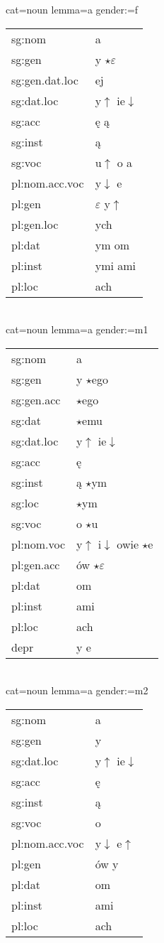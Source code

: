 \documentclass{article}
\begin{document}
\begin{multicols}{2}
cat=noun lemma=a gender:=f\\
\begin{tabular}{l|l}
sg:nom & a\\
sg:gen & y $\star\varepsilon$\\
sg:gen.dat.loc & ej\\
sg:dat.loc & y$\uparrow$ ie$\downarrow$\\
sg:acc & ę ą\\
sg:inst & ą\\
sg:voc & u$\uparrow$ o a\\
pl:nom.acc.voc & y$\downarrow$ e\\
pl:gen & $\varepsilon$ y$\uparrow$\\
pl:gen.loc & ych\\
pl:dat & ym om\\
pl:inst & ymi ami\\
pl:loc & ach\\
\end{tabular}\\

cat=noun lemma=a gender:=m1\\
\begin{tabular}{l|l}
sg:nom & a\\
sg:gen & y $\star$ego\\
sg:gen.acc & $\star$ego\\
sg:dat & $\star$emu\\
sg:dat.loc & y$\uparrow$ ie$\downarrow$\\
sg:acc & ę\\
sg:inst & ą $\star$ym\\
sg:loc & $\star$ym\\
sg:voc & o $\star$u\\
pl:nom.voc & y$\uparrow$ i$\downarrow$ owie $\star$e\\
pl:gen.acc & ów $\star\varepsilon$\\
pl:dat & om\\
pl:inst & ami\\
pl:loc & ach\\
depr & y e\\
\end{tabular}\\

cat=noun lemma=a gender:=m2\\
\begin{tabular}{l|l}
sg:nom & a\\
sg:gen & y\\
sg:dat.loc & y$\uparrow$ ie$\downarrow$\\
sg:acc & ę\\
sg:inst & ą\\
sg:voc & o\\
pl:nom.acc.voc & y$\downarrow$ e$\uparrow$\\
pl:gen & ów y\\
pl:dat & om\\
pl:inst & ami\\
pl:loc & ach\\
\end{tabular}\\


\end{multicols}
\end{document}
